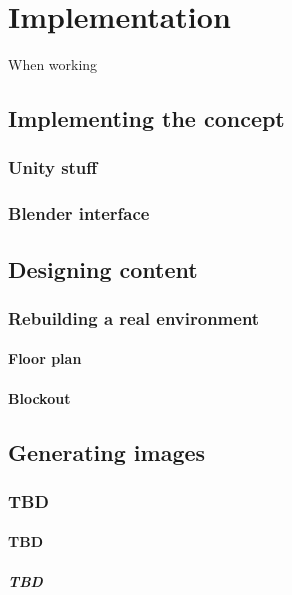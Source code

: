 \chapter{Implementation}
When working
\section{Implementing the concept}
\subsection{Unity stuff}
\subsection{Blender interface}

\section{Designing content}
\subsection{Rebuilding a real environment}
\subsubsection{Floor plan}
\subsubsection{Blockout}

\section{Generating images}

\subsection{TBD}

\subsubsection{TBD}
 
\paragraph{TBD}